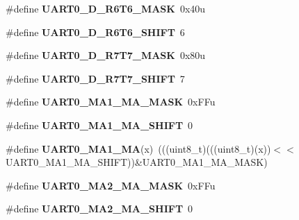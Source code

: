 \begin{DoxyCompactItemize}
\#define {\bfseries U\+A\+R\+T0\+\_\+\+D\+\_\+\+R6\+T6\+\_\+\+M\+A\+SK}~0x40u
\item 
\mbox{\label{group___u_a_r_t0___register___masks_ga1083033a9d6894a5c264dac4f7dc67ce}} 
\#define {\bfseries U\+A\+R\+T0\+\_\+\+D\+\_\+\+R6\+T6\+\_\+\+S\+H\+I\+FT}~6
\item 
\mbox{\label{group___u_a_r_t0___register___masks_gab3a6b86f1cf57c7559bd4200509a354b}} 
\#define {\bfseries U\+A\+R\+T0\+\_\+\+D\+\_\+\+R7\+T7\+\_\+\+M\+A\+SK}~0x80u
\item 
\mbox{\label{group___u_a_r_t0___register___masks_gabe35832ee13e5e5b6ab53ad6f357bac2}} 
\#define {\bfseries U\+A\+R\+T0\+\_\+\+D\+\_\+\+R7\+T7\+\_\+\+S\+H\+I\+FT}~7
\item 
\mbox{\label{group___u_a_r_t0___register___masks_ga9eedde4d09d80e7f305d5217aa6b894f}} 
\#define {\bfseries U\+A\+R\+T0\+\_\+\+M\+A1\+\_\+\+M\+A\+\_\+\+M\+A\+SK}~0x\+F\+Fu
\item 
\mbox{\label{group___u_a_r_t0___register___masks_ga97f0146ebe2278bfbb80f350bcb8f238}} 
\#define {\bfseries U\+A\+R\+T0\+\_\+\+M\+A1\+\_\+\+M\+A\+\_\+\+S\+H\+I\+FT}~0
\item 
\mbox{\label{group___u_a_r_t0___register___masks_gad868c0319c33d444b3aac8c88f4132d3}} 
\#define {\bfseries U\+A\+R\+T0\+\_\+\+M\+A1\+\_\+\+MA}(x)~(((uint8\+\_\+t)(((uint8\+\_\+t)(x))$<$$<$U\+A\+R\+T0\+\_\+\+M\+A1\+\_\+\+M\+A\+\_\+\+S\+H\+I\+FT))\&U\+A\+R\+T0\+\_\+\+M\+A1\+\_\+\+M\+A\+\_\+\+M\+A\+SK)
\item 
\mbox{\label{group___u_a_r_t0___register___masks_ga92464fbb6ee7662411228e760fab58d3}} 
\#define {\bfseries U\+A\+R\+T0\+\_\+\+M\+A2\+\_\+\+M\+A\+\_\+\+M\+A\+SK}~0x\+F\+Fu
\item 
\mbox{\label{group___u_a_r_t0___register___masks_gab09c5cd573077ea52dd66656d8b4157d}} 
\#define {\bfseries U\+A\+R\+T0\+\_\+\+M\+A2\+\_\+\+M\+A\+\_\+\+S\+H\+I\+FT}~0
\item 
$$
\end{DoxyCompactItemize}
